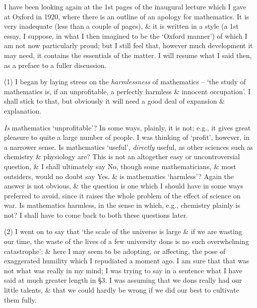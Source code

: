 \documentclass{article}
\numberwithin{equation}{section}
\begin{document}
I have been looking again at the 1st pages of the inaugural lecture which I gave at Oxford in 1920, where there is an outline of an apology for mathematics. It is very inadequate (less than a couple of pages), \& it is written in a style (a 1st essay, I suppose, in what I then imagined to be the `Oxford manner') of which I am not now particularly proud; but I still feel that, however much development it may need, it contains the essentials of the matter. I will resume what I said then, as a preface to a fuller discussion.

(1) I began by laying stress on the \textit{harmlessness} of mathematics -- `the study of mathematics is, if an unprofitable, a perfectly harmless \& innocent occupation'. I shall stick to that, but obviously it will need a good deal of expansion \& explanation.

\textit{Is} mathematics `unprofitable'? In some ways, plainly, it is not; e.g., it gives great pleasure to quite a large number of people. I was thinking of `profit', however, in a narrower sense. Is mathematics `useful', \textit{directly} useful, as other sciences such as chemistry \& physiology are? This is not an altogether easy or uncontroversial question, \& I shall ultimately say No, though some mathematicians, \& most outsiders, would no doubt say Yes. \& is mathematics `harmless'? Again the answer is not obvious, \& the question is one which I should have in some ways preferred to avoid, since it raises the whole problem of the effect of science on war. Is mathematics harmless, in the sense in which, e.g., chemistry plainly is not? I shall have to come back to both these questions later.

(2) I went on to say that `the scale of the universe is large \& if we are wasting our time, the waste of the lives of a few university dons is no such overwhelming catastrophe': \& here I may seem to be adopting, or affecting, the pose of exaggerated humility which I repudiated a moment ago. I am sure that that was not what was really in my mind; I was trying to say in a sentence what I have said at much greater length in \S3. I was assuming that we dons really had our little talents, \& that we could hardly be wrong if we did our best to cultivate them fully.
\end{document}

